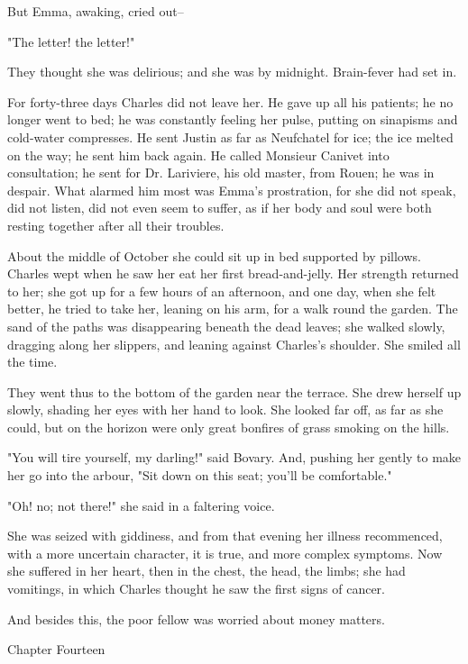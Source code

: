 \documentclass[11pt,twocolumn]{ltugboat}
\begin{document}
But Emma, awaking, cried out--

"The letter! the letter!"

They thought she was delirious; and she was by midnight. Brain-fever had
set in.

For forty-three days Charles did not leave her. He gave up all his
patients; he no longer went to bed; he was constantly feeling her pulse,
putting on sinapisms and cold-water compresses. He sent Justin as far as
Neufchatel for ice; the ice melted on the way; he sent him back again.
He called Monsieur Canivet into consultation; he sent for Dr. Lariviere,
his old master, from Rouen; he was in despair. What alarmed him most was
Emma's prostration, for she did not speak, did not listen, did not even
seem to suffer, as if her body and soul were both resting together after
all their troubles.

About the middle of October she could sit up in bed supported by
pillows. Charles wept when he saw her eat her first bread-and-jelly. Her
strength returned to her; she got up for a few hours of an afternoon,
and one day, when she felt better, he tried to take her, leaning on his
arm, for a walk round the garden. The sand of the paths was disappearing
beneath the dead leaves; she walked slowly, dragging along her slippers,
and leaning against Charles's shoulder. She smiled all the time.

They went thus to the bottom of the garden near the terrace. She drew
herself up slowly, shading her eyes with her hand to look. She looked
far off, as far as she could, but on the horizon were only great
bonfires of grass smoking on the hills.

"You will tire yourself, my darling!" said Bovary. And, pushing her
gently to make her go into the arbour, "Sit down on this seat; you'll be
comfortable."

"Oh! no; not there!" she said in a faltering voice.

She was seized with giddiness, and from that evening her illness
recommenced, with a more uncertain character, it is true, and more
complex symptoms. Now she suffered in her heart, then in the chest, the
head, the limbs; she had vomitings, in which Charles thought he saw the
first signs of cancer.

And besides this, the poor fellow was worried about money matters.



Chapter Fourteen
\end{document}
